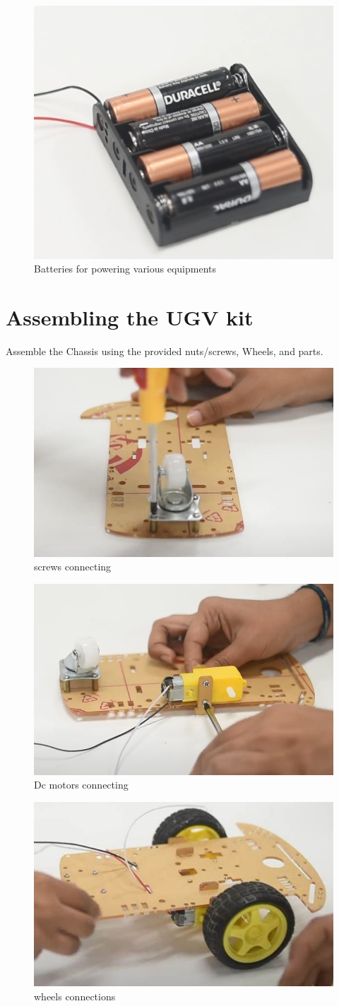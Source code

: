 \begin{figure}[!ht]
\centering
\includegraphics[width=0.5\columnwidth]{ugv/figs/battery.png}
\caption{Batteries for powering various equipments}
\label{fig:battery}
\end{figure}

\section{Assembling the UGV kit}

Assemble the Chassis using the provided nuts/screws, Wheels, and parts. 
 
 \begin{figure}[!ht]
\centering
\includegraphics[width=0.3\columnwidth]{ugv/figs/2.png}
\centering
\caption{screws connecting }
\end{figure}
 
 \begin{figure}[!ht]
\centering
\includegraphics[width=0.3\columnwidth]{ugv/figs/3.png}
\caption{Dc motors connecting}
\end{figure}
 \begin{figure}[!ht]
\centering
\includegraphics[width=0.3\columnwidth]{ugv/figs/6.jpg}
\caption{wheels connections }
\end{figure}
